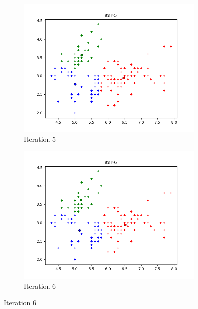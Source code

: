 \documentclass[french]{article}
\begin{document}
\newpage
\begin{figure}[h!]
\centering
\begin{subfigure}{.5\textwidth}
  \centering
  \includegraphics[width=\linewidth]{img/iter-5.png}
  \caption{Iteration 5}
\end{subfigure}%
\begin{subfigure}{.5\textwidth}
  \centering
  \includegraphics[width=\linewidth]{img/iter-6.png}
  \caption{Iteration 6}
\end{subfigure}%
\end{figure}
\end{document}
